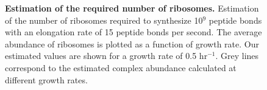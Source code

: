 \begin{figure}
        \caption{\textbf{Estimation of the required number of ribosomes.} Estimation of the
        number of ribosomes required to synthesize 10$^9$ peptide bonds with an
        elongation rate of 15 peptide bonds per second. The
        average abundance of ribosomes is plotted as a function of growth rate.
        Our estimated values are shown for a growth rate of 0.5 hr$^{-1}$.
        Grey lines correspond to the estimated complex abundance calculated at
        different growth rates.} \label{fig:protein_synthesis}

        \label{figsupp:tRNA}
\end{figure}
